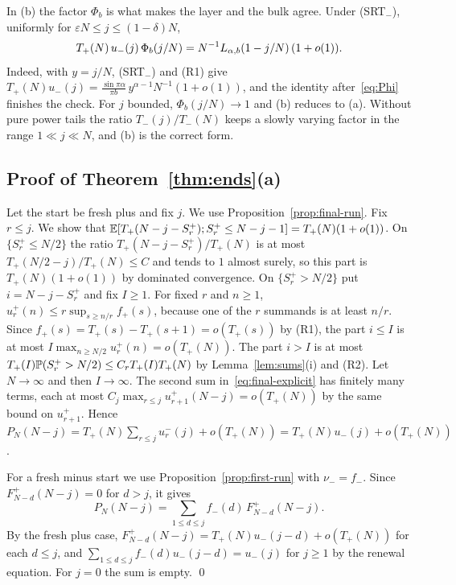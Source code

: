 In (b) the factor $\Phi_b$ is what makes the layer and the bulk agree. Under
(SRT$_\minus$), uniformly for $\varepsilon N\le j\le(1-\delta)N$,
\begin{equation}\label{eq:layer-bulk}
 T_{+}(N)\,u_{-}(j)\,\Phi_b(j/N)=N^{-1}L_{\alpha,b}(1-j/N)\,(1+o(1)).
\end{equation}
Indeed, with $y=j/N$, (SRT$_\minus$) and (R1) give
$T_\plus(N)u_\minus(j)=\frac{\sin\pi\alpha}{\pi b}\,y^{\alpha-1}N^{-1}(1+o(1))$, and the identity
after~\eqref{eq:Phi} finishes the check. For $j$ bounded, $\Phi_b(j/N)\to1$ and (b)
reduces to (a). Without pure power tails the ratio $T_\minus(j)/T_\minus(N)$ keeps a slowly
varying factor in the range $1\ll j\ll N$, and (b) is the correct form.

\subsection{Proof of Theorem~\ref{thm:ends}(a)}

Let the start be fresh plus and fix $j$. We use Proposition~\ref{prop:final-run}. Fix
$r\le j$. We show that
$\mathbb{E}[T_{+}(N-j-S^{+}_r);S^{+}_r\le N-j-1]=T_{+}(N)(1+o(1))$. On
$\{S^\plus_r\le N/2\}$ the ratio $T_\plus(N-j-S^\plus_r)/T_\plus(N)$ is at most
$T_\plus(N/2-j)/T_\plus(N)\le C$ and tends to $1$ almost surely, so this part is
$T_\plus(N)(1+o(1))$ by dominated convergence. On $\{S^\plus_r>N/2\}$ put
$i=N-j-S^\plus_r$ and fix $I\ge1$. For fixed $r$ and $n\ge1$,
$u^\plus_r(n)\le r\sup_{s\ge n/r}f_\plus(s)$, because one of the $r$ summands is at least
$n/r$. Since $f_\plus(s)=T_\plus(s)-T_\plus(s+1)=o(T_\plus(s))$ by (R1), the part $i\le I$ is
at most $I\max_{n\ge N/2}u^\plus_r(n)=o(T_\plus(N))$. The part $i>I$ is at most
$T_{+}(I)\mathbb{P}(S^{+}_r>N/2)\le C_rT_{+}(I)T_{+}(N)$ by Lemma~\ref{lem:sums}(i) and
(R2). Let $N\to\infty$ and then $I\to\infty$. The second sum
in~\eqref{eq:final-explicit} has finitely many terms, each at most
$C_j\max_{r\le j}u^\plus_{r+1}(N-j)=o(T_\plus(N))$ by the same bound on $u^\plus_{r+1}$.
Hence $P_N(N-j)=T_\plus(N)\sum_{r\le j}u^\minus_r(j)+o(T_\plus(N))=T_\plus(N)u_\minus(j)+o(T_\plus(N))$.

For a fresh minus start we use Proposition~\ref{prop:first-run} with $\nu_\minus=f_\minus$.
Since $F^\plus_{N-d}(N-j)=0$ for $d>j$, it gives
\[
 P_N(N-j)=\sum_{1\le d\le j}f_\minus(d)\,F^\plus_{N-d}(N-j).
\] By the fresh plus case, $F^\plus_{N-d}(N-j)=T_\plus(N)u_\minus(j-d)+o(T_\plus(N))$
for each $d\le j$, and $\sum_{1\le d\le j}f_\minus(d)u_\minus(j-d)=u_\minus(j)$ for $j\ge1$
by the renewal equation. For $j=0$ the sum is empty. \qed

